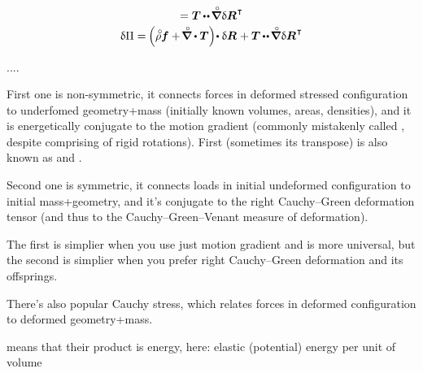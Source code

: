\begin{equation*}
\begin{array}{c}
= \firstpiolakirchhoffstress \hspace{-0.1ex} \dotdotp \hspace{-0.2ex} \boldnablacircled \hspace{.1ex} \variation{\bm{R}}^{\hspace{0.12ex}\T} \\[.25em]
%
\variation{\Pi}
= \hspace{-0.16ex} \left(^{\mathstrut} \hspace{-0.1ex} \mathcircabove{\rho} \bm{f} + \hspace{-0.25ex} \boldnablacircled \dotp \firstpiolakirchhoffstress \right) \hspace{-0.4ex} \dotp \variation{\bm{R}}
\hspace{.1ex}
+ \firstpiolakirchhoffstress \hspace{-0.1ex} \dotdotp \hspace{-0.2ex} \boldnablacircled \hspace{.1ex} \variation{\bm{R}}^{\hspace{0.12ex}\T}
\end{array}
\end{equation*}



....


First one is non-symmetric, it connects forces in deformed stressed configuration to underfomed geometry+mass (initially known volumes, areas, densities), and it is energetically conjugate to the motion gradient (commonly mistakenly called , despite comprising of rigid rotations). First (sometimes its transpose) is also known as  and .

Second one is symmetric, it connects loads in initial undeformed configuration to initial mass+geometry, and it’s conjugate to the right Cauchy\hbox{--}Green deformation tensor (and thus to the Cauchy\hbox{--}Green\hbox{--}Venant measure of deformation).

The first is simplier when you use just motion gradient and is more universal, but the second is simplier when you prefer right Cauchy\hbox{--}Green deformation and its offsprings.

There’s also popular Cauchy stress, which relates forces in deformed configuration to deformed geometry+mass.

 means that their product is energy, here: elastic (potential) energy per unit of volume


